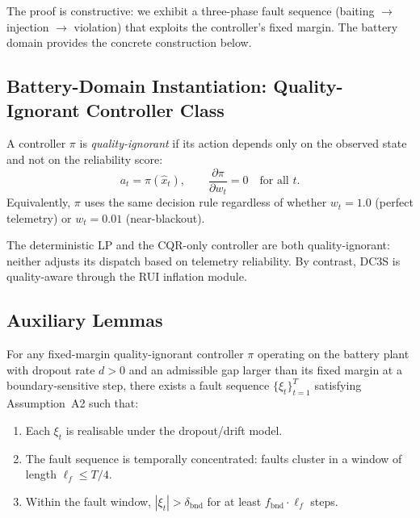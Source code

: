 The proof is constructive: we exhibit a three-phase fault sequence
(baiting $\to$ injection $\to$ violation) that exploits the controller's
fixed margin.  The battery domain provides the concrete construction below.

\subsection{Battery-Domain Instantiation: Quality-Ignorant Controller Class}

\begin{definition}
\label{def:quality-ignorant}
A controller $\pi$ is \emph{quality-ignorant} if its action depends only
on the observed state and not on the reliability score:
\[
  a_t = \pi(\hat{x}_t), \qquad
  \frac{\partial \pi}{\partial w_t} = 0 \quad\text{for all } t.
\]
Equivalently, $\pi$ uses the same decision rule regardless of whether
$w_t = 1.0$ (perfect telemetry) or $w_t = 0.01$ (near-blackout).
\end{definition}

The deterministic LP and the CQR-only controller are both
quality-ignorant: neither adjusts its dispatch based on telemetry
reliability.  By contrast, DC3S is quality-aware through the RUI
inflation module.

\subsection{Auxiliary Lemmas}

\begin{lemma}
\label{lem:admissible-fault}
For any fixed-margin quality-ignorant controller $\pi$ operating on the battery
plant with dropout rate $d > 0$ and an admissible gap larger than its fixed
margin at a boundary-sensitive step, there exists a fault sequence
$\{\xi_t\}_{t=1}^T$ satisfying Assumption~A2 such that:
\begin{enumerate}
  \item Each $\xi_t$ is realisable under the dropout/drift model.
  \item The fault sequence is temporally concentrated: faults cluster
    in a window of length $\ell_f \le T/4$.
  \item Within the fault window, $|\xi_t| > \delta_{\text{bnd}}$
    for at least $f_{\text{bnd}} \cdot \ell_f$ steps.
\end{enumerate}
\end{lemma}

